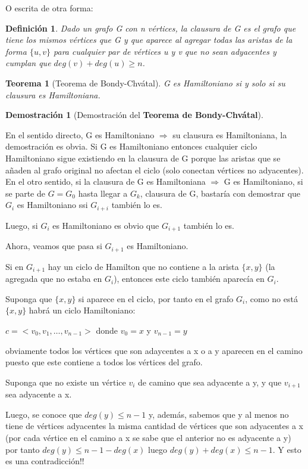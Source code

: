 \documentclass[a4paper,1pt]{report}
\newtheorem*{teo}{Teorema}
\newtheorem*{dem}{Demostración}
\newtheorem*{dfn}{Definición}
\begin{document}
 O escrita de otra forma:
 
  \begin{dfn}
  Dado un grafo G con n vértices, la clausura de G es el grafo que tiene los mismos vértices que G y que aparece al agregar todas las aristas de la forma $\{u, v\}$ para cualquier par de vértices u y v que no sean adyacentes y cumplan que 
  $deg(v) + deg(u)\geq n$.
 \end{dfn}
 
 \begin{teo}[Teorema de Bondy-Chvátal]
  G es Hamiltoniano si y solo si su clausura es Hamiltoniana.
 \end{teo}

  \begin{dem}[Demostración del \textbf{Teorema de Bondy-Chvátal}] \end{dem}

En el sentido directo, G es Hamiltoniano $\Rightarrow$ su clausura es Hamiltoniana, la demostración es obvia. Si G es Hamiltoniano entonces cualquier ciclo Hamiltoniano sigue existiendo en la clausura de G porque las aristas que se añaden al grafo original no afectan el ciclo (solo conectan vértices no adyacentes).\\
  
En el otro sentido, si la clausura de G es Hamiltoniana $\Rightarrow$ G es Hamiltoniano, si se parte de $G=G_0$ hasta llegar a $G_k$, clausura de G, bastaría con demostrar que $G_i$ es Hamiltoniano ssi $G_{i+i}$ también lo es.

Luego, si $G_i$ es Hamiltoniano es obvio que $G_{i+1}$ también lo es.

Ahora, veamos que pasa si $G_{i+1}$ es Hamiltoniano.

Si en $G_{i+1}$ hay un ciclo de Hamilton que no contiene a la arista $\{x,y\}$ (la agregada que no estaba en $G_i$), entonces este ciclo también aparecía en $G_i$.

Suponga que $\{x,y\}$ si aparece en el ciclo, por tanto en el grafo $G_i$, como no está $\{x,y\}$ habrá un ciclo Hamiltoniano: 

$c=<v_0,v_1,\dots,v_{n-1}>$ donde $v_0=x$ y $v_{n-1}=y$

obviamente todos los vértices que son adaycentes a x o a y aparecen en el camino puesto que este contiene a todos los vértices del grafo.

Suponga que no existe un vértice $v_i$ de camino que sea adyacente a y, y que $v_{i+1}$ sea adyacente a x. 

Luego, se conoce que $deg(y)\leq n-1$ y, además, sabemos que y al menos no tiene de vértices adyacentes la misma cantidad de vértices que son adyacentes a x (por cada vértice en el camino a x se sabe que el anterior no es adyacente a y) por tanto $deg(y)\leq n-1 - deg(x)$ luego $deg(y) + deg(x)\leq n-1 $. Y esto es una contradicción!! 
\end{document}
